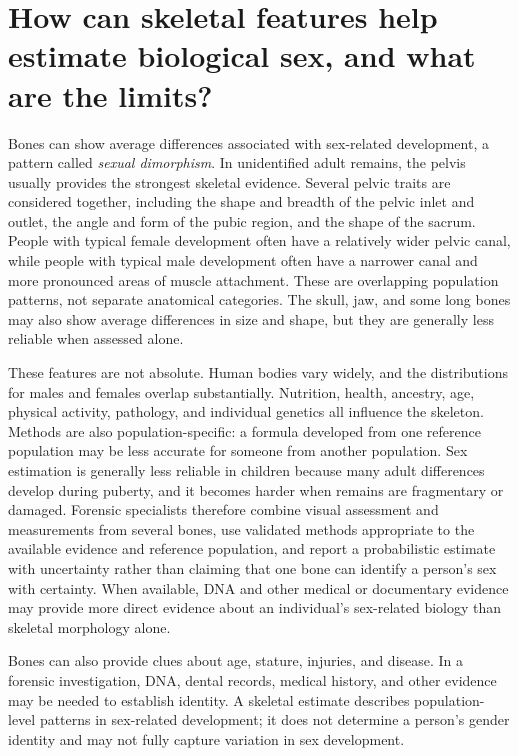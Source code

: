 \documentclass[11pt,oneside]{report}
\begin{document}
\section{How can skeletal features help estimate biological sex, and what are the limits?}

Bones can show average differences associated with sex-related development, a
pattern called \emph{sexual dimorphism}. In unidentified adult remains, the
pelvis usually provides the strongest skeletal evidence. Several pelvic traits
are considered together, including the shape and breadth of the pelvic inlet and
outlet, the angle and form of the pubic region, and the shape of the sacrum.
People with typical female development often have a relatively wider pelvic
canal, while people with typical male development often have a narrower canal
and more pronounced areas of muscle attachment. These are overlapping population
patterns, not separate anatomical categories. The skull, jaw, and some long
bones may also show average differences in size and shape, but they are
generally less reliable when assessed alone.

These features are not absolute. Human bodies vary widely, and the distributions
for males and females overlap substantially. Nutrition, health, ancestry, age,
physical activity, pathology, and individual genetics all influence the
skeleton. Methods are also population-specific: a formula developed from one
reference population may be less accurate for someone from another population.
Sex estimation is generally less reliable in children because many adult
differences develop during puberty, and it becomes harder when remains are
fragmentary or damaged. Forensic specialists therefore combine visual assessment
and measurements from several bones, use validated methods appropriate to the
available evidence and reference population, and report a probabilistic estimate
with uncertainty rather than claiming that one bone can identify a person's sex
with certainty. When available, DNA and other medical or documentary evidence
may provide more direct evidence about an individual's sex-related biology than
skeletal morphology alone.

Bones can also provide clues about age, stature, injuries, and disease. In a
forensic investigation, DNA, dental records, medical history, and other evidence
may be needed to establish identity. A skeletal estimate describes population-
level patterns in sex-related development; it does not determine a person's
gender identity and may not fully capture variation in sex development.
\end{document}
